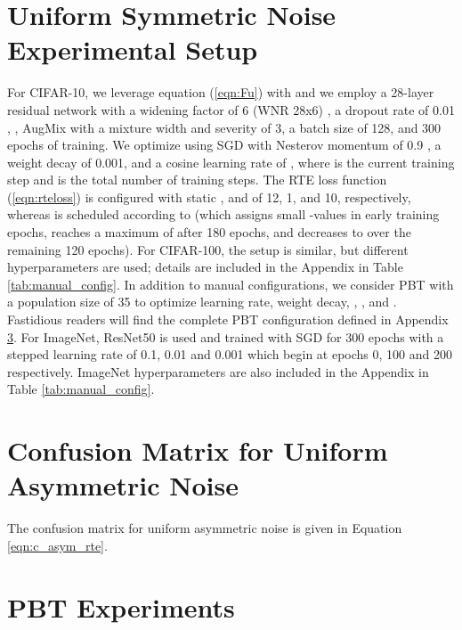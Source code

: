 \documentclass{article}
\begin{document}
\section{Uniform Symmetric Noise Experimental Setup}
\label{appendix:uniformsetup}

For CIFAR-10, we leverage equation (\ref{eqn:Fu}) with  and we employ a 28-layer residual network \cite{He_2016_CVPR} with a widening factor of 6 (WNR 28x6) \cite{2016arXiv160507146Z}, a dropout rate of 0.01 \cite{JMLR:v15:srivastava14a}, , AugMix with a mixture width and severity of 3, a batch size of 128, and 300 epochs of training. We optimize using SGD with Nesterov momentum of 0.9 \cite{nesterov}, a weight decay of 0.001, and a cosine learning rate \cite{sgdr2017:} of , where  is the current training step and  is the total number of training steps. The RTE loss function (\ref{eqn:rteloss}) is configured with static ,  and  of 12, 1, and 10, respectively, whereas  is scheduled according to  (which assigns small -values in early training epochs, reaches a maximum of  after 180 epochs, and decreases to  over the remaining 120 epochs). For CIFAR-100, the setup is similar, but different hyperparameters are used; details are included in the Appendix in Table \ref{tab:manual_config}. In addition to manual configurations, we consider PBT with a population size of 35 to optimize learning rate, weight decay, , ,  and .  Fastidious readers will find the complete PBT configuration defined in Appendix \ref{PBThyper}. For ImageNet, ResNet50 is used and trained with SGD for 300 epochs with a stepped learning rate of 0.1, 0.01 and 0.001 which begin at epochs 0, 100 and 200 respectively. ImageNet hyperparameters are also included in the Appendix in Table \ref{tab:manual_config}.



\section{Confusion Matrix for Uniform Asymmetric Noise}
\label{appendix:asymsetup}

The confusion matrix for uniform asymmetric noise is given in Equation \ref{eqn:c_asym_rte}.

\begin{table*}


\end{table*}



\section{PBT Experiments}
\label{PBThyper}
\end{document}
